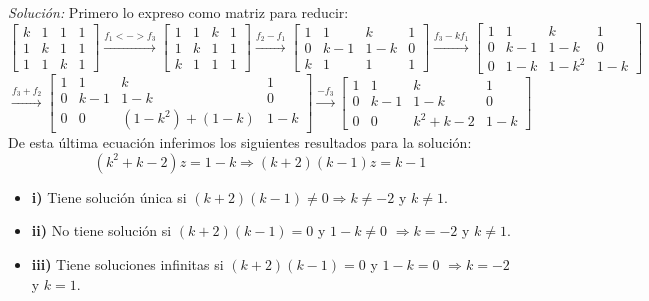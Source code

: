 \documentclass{article}
\newenvironment{solution}
    {\textit{Solución:}}
    {}
\begin{document}
\begin{solution}
Primero lo expreso como matriz para reducir:
\[
\begin{bmatrix}
k & 1 & 1 & 1 \\
1 & k & 1 & 1 \\
1 & 1 & k & 1
\end{bmatrix} \xrightarrow{f_1 <-> f_3}
\begin{bmatrix}
1 & 1 & k & 1 \\
1 & k & 1 & 1 \\
k & 1 & 1 & 1
\end{bmatrix} \xrightarrow{f_2-f_1}
\begin{bmatrix}
1 & 1 & k & 1 \\
0 & k-1 & 1-k & 0 \\
k & 1 & 1 & 1
\end{bmatrix} \xrightarrow{f_3-kf_1}
\begin{bmatrix}
1 & 1 & k & 1 \\
0 & k-1 & 1-k & 0 \\
0 & 1-k & 1-k^2 & 1-k
\end{bmatrix} 
\]\[
\xrightarrow{f_3+f_2}
\begin{bmatrix}
1 & 1 & k & 1 \\
0 & k-1 & 1-k & 0 \\
0 & 0 & (1-k^2)+(1-k) & 1-k
\end{bmatrix} \xrightarrow{-f_3}
\begin{bmatrix}
1 & 1 & k & 1 \\
0 & k-1 & 1-k & 0 \\
0 & 0 & k^2+k-2 & 1-k
\end{bmatrix}
\]
De esta última ecuación inferimos los siguientes resultados para la solución:
\[
(k^2+k-2)z = 1-k \Rightarrow (k+2)(k-1)z=k-1
\]\begin{itemize}
\item 
\textbf{i)} Tiene solución única si $(k+2)(k-1) \neq 0 \Rightarrow k\neq -2$ y $k\neq 1$.
\item 
\textbf{ii)} No tiene solución si $(k+2)(k-1) = 0$ y $1-k \neq 0$ $\Rightarrow k=-2$ y $k\neq 1$.
\item 
\textbf{iii)} Tiene soluciones infinitas si $(k+2)(k-1) = 0$ y $1-k = 0$ $\Rightarrow k=-2$ y $k = 1$.
\end{itemize}
\end{solution}
\end{document}
